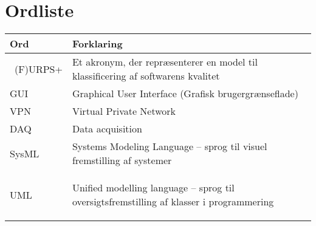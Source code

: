 \chapter{Ordliste}

\begin{longtabu} to 
    Ord &    Forklaring\\
    \toprule\
(F)URPS+ 	&    Et akronym, der repræsenterer en model til klassificering af softwarens kvalitet \\
    GUI		&	Graphical User Interface (Grafisk brugergrænseflade)\\
    VPN		&	Virtual Private Network\\
    DAQ		&	Data acquisition \\
    SysML	&   Systems Modeling Language – sprog til visuel fremstilling af systemer \\
    UML		& Unified modelling language – sprog til oversigtsfremstilling af klasser i programmering
 
\label{forkort}
\end{longtabu}
